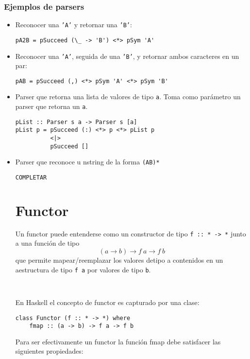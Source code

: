 \documentclass{article}
\newcommand{\imp}[1]{\textcolor{color1}{#1}}
\begin{document}
\subsubsection{Ejemplos de parsers}

\begin{itemize}
\item Reconocer una \texttt{'A'} y retornar una \texttt{'B'}:
\begin{lstlisting}
pA2B = pSucceed (\_ -> 'B') <*> pSym 'A'
\end{lstlisting}
\item Reconocer una \texttt{'A'}, seguida de una \texttt{'B'}, y retornar ambos caracteres en un par:
\begin{lstlisting}
pAB = pSucceed (,) <*> pSym 'A' <*> pSym 'B'
\end{lstlisting}
\item Parser que retorna una lista de valores de tipo \imp{\texttt{a}}. Toma como parámetro un parser que retorna un \texttt{a}.
\begin{lstlisting}
pList :: Parser s a -> Parser s [a]
pList p = pSucceed (:) <*> p <*> pList p
          <|>
          pSucceed []
\end{lstlisting}
\item Parser que reconoce u nstring de la forma \texttt{(AB)*}
\begin{lstlisting}
COMPLETAR
\end{lstlisting}


\section{Functor}\label{sec:functor}

\noindent Un \imp{functor} puede entenderse como un constructor de tipo \texttt{f :: * -> *} junto a una función de tipo 
\[(a  \rightarrow b) \rightarrow f~a \rightarrow f~b\]
que permite mapear/reemplazar los valores detipo a contenidos en un aestructura de tipo \imp{\texttt{f a}} por valores de tipo \imp{\texttt{b}}.

\

En Haskell el concepto de functor es capturado por una clase:

\begin{lstlisting}
class Functor (f :: * -> *) where
    fmap :: (a -> b) -> f a -> f b
\end{lstlisting}

Para ser efectivamente un functor la función fmap debe satisfacer las siguientes propiedades:


\end{itemize}
\end{document}
